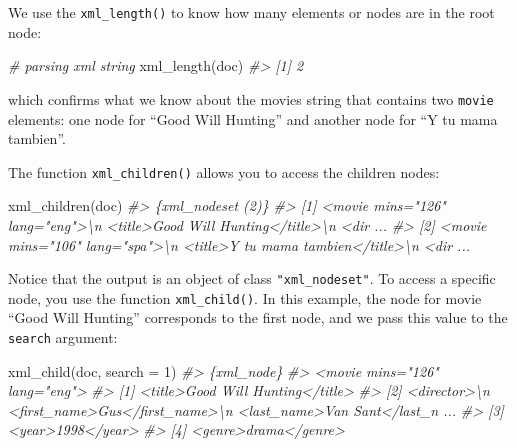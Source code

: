 \documentclass[
]{book}
\newenvironment{Shaded}{\begin{snugshade}}{\end{snugshade}}
\newcommand{\AttributeTok}[1]{\textcolor[rgb]{0.77,0.63,0.00}{#1}}
\newcommand{\CommentTok}[1]{\textcolor[rgb]{0.56,0.35,0.01}{\textit{#1}}}
\newcommand{\DecValTok}[1]{\textcolor[rgb]{0.00,0.00,0.81}{#1}}
\newcommand{\FunctionTok}[1]{\textcolor[rgb]{0.00,0.00,0.00}{#1}}
\newcommand{\NormalTok}[1]{#1}
\begin{document}
We use the \texttt{xml\_length()} to know how many elements or nodes are in the root
node:

\begin{Shaded}
\begin{Highlighting}[]
\CommentTok{\# parsing xml string}
\FunctionTok{xml\_length}\NormalTok{(doc)}
\CommentTok{\#\textgreater{} [1] 2}
\end{Highlighting}
\end{Shaded}

which confirms what we know about the movies string that contains two \texttt{movie}
elements: one node for ``Good Will Hunting'' and another node for ``Y tu mama
tambien''.

The function \texttt{xml\_children()} allows you to access the children nodes:

\begin{Shaded}
\begin{Highlighting}[]
\FunctionTok{xml\_children}\NormalTok{(doc)}
\CommentTok{\#\textgreater{} \{xml\_nodeset (2)\}}
\CommentTok{\#\textgreater{} [1] \textless{}movie mins="126" lang="eng"\textgreater{}\textbackslash{}n  \textless{}title\textgreater{}Good Will Hunting\textless{}/title\textgreater{}\textbackslash{}n  \textless{}dir ...}
\CommentTok{\#\textgreater{} [2] \textless{}movie mins="106" lang="spa"\textgreater{}\textbackslash{}n  \textless{}title\textgreater{}Y tu mama tambien\textless{}/title\textgreater{}\textbackslash{}n  \textless{}dir ...}
\end{Highlighting}
\end{Shaded}

Notice that the output is an object of class \texttt{"xml\_nodeset"}. To access a
specific node, you use the function \texttt{xml\_child()}. In this example, the node
for movie ``Good Will Hunting'' corresponds to the first node, and we pass this
value to the \texttt{search} argument:

\begin{Shaded}
\begin{Highlighting}[]
\FunctionTok{xml\_child}\NormalTok{(doc, }\AttributeTok{search =} \DecValTok{1}\NormalTok{)}
\CommentTok{\#\textgreater{} \{xml\_node\}}
\CommentTok{\#\textgreater{} \textless{}movie mins="126" lang="eng"\textgreater{}}
\CommentTok{\#\textgreater{} [1] \textless{}title\textgreater{}Good Will Hunting\textless{}/title\textgreater{}}
\CommentTok{\#\textgreater{} [2] \textless{}director\textgreater{}\textbackslash{}n  \textless{}first\_name\textgreater{}Gus\textless{}/first\_name\textgreater{}\textbackslash{}n  \textless{}last\_name\textgreater{}Van Sant\textless{}/last\_n ...}
\CommentTok{\#\textgreater{} [3] \textless{}year\textgreater{}1998\textless{}/year\textgreater{}}
\CommentTok{\#\textgreater{} [4] \textless{}genre\textgreater{}drama\textless{}/genre\textgreater{}}
\end{Highlighting}
\end{Shaded}
\end{document}
